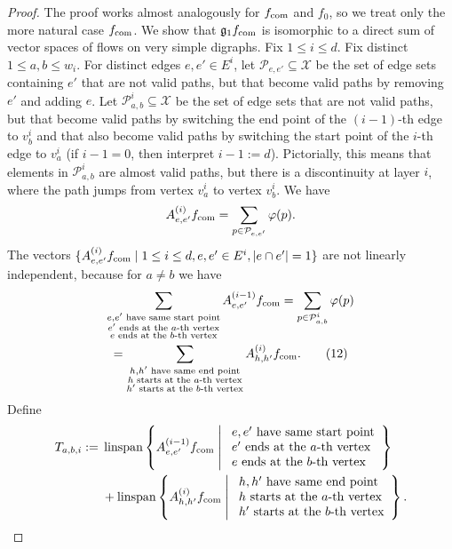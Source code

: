 \documentclass[10pt,a4paper]{article}
\newcommand{\fcom}{f_{\rm com}}
\newcommand{\g}{\mathfrak g}
\DeclareMathOperator{\linspan}{linspan}
\begin{document}
\begin{proof}
The proof works almost analogously for $\fcom$ and $f_0$, so we treat only the more natural case $\fcom$. We show that $\g_1\fcom$ is isomorphic to a direct sum of vector spaces of flows on very simple digraphs. Fix $1\le i\le d$. Fix distinct $1\le a,b\le w_i$. For distinct edges $e,e'\in E^i$, let $\mathcal P_{e,e'}\subseteq\mathcal X$ be the set of edge sets containing $e'$ that are not valid paths, but that become valid paths by removing $e'$ and adding $e$. Let $\mathcal P^i_{a,b}\subseteq\mathcal X$ be the set of edge sets that are not valid paths, but that become valid paths by switching the end point of the $(i-1)$-th edge to $v_b^i$ and that also become valid paths by switching the start point of the $i$-th edge to $v_a^i$ (if $i-1=0$, then interpret $i-1:=d$). Pictorially, this means that elements in $\mathcal P^i_{a,b}$ are almost valid paths, but there is a discontinuity at layer $i$, where the path jumps from vertex $v_a^i$ to vertex $v_b^i$. We have
\[A^{(i)}_{e,e'}\fcom=\sum_{p\in\mathcal P_{e,e'}}\varphi(p).\]
The vectors $\{A^{(i)}_{e,e'}\fcom\mid1\le i\le d,e,e'\in E^i,|e\cap e'|=1\}$ are not linearly independent, because for $a\ne b$ we have
\begin{multline*}
\sum_{\substack{e,e'\text{ have same start point}\\e'\text{ ends at the }a\text{-th vertex}\\e\text{ ends at the }b\text{-th vertex}}}A^{(i-1)}_{e,e'}\fcom=\sum_{p\in\mathcal P^i_{a,b}}\varphi(p)\\
=\sum_{\substack{h,h'\text{ have same end point}\\h\text{ starts at the }a\text{-th vertex}\\h'\text{ starts at the }b\text{-th vertex}}}A^{(i)}_{h,h'}\fcom.\tag{12}\label{eq:dependency}
\end{multline*}
Define
\begin{align*}
T_{a,b,i}:={}&\linspan\left\{A^{(i-1)}_{e,e'}\fcom\;\middle|\;\begin{array}{l}e,e'\text{ have same start point}\\e'\text{ ends at the }a\text{-th vertex}\\e\text{ ends at the }b\text{-th vertex}\end{array}\right\}\\
&+\linspan\left\{A^{(i)}_{h,h'}\fcom\;\middle|\;\begin{array}{l}h,h'\text{ have same end point}\\h\text{ starts at the }a\text{-th vertex}\\h'\text{ starts at the }b\text{-th vertex}\end{array}\right\}.

\end{align*}
\end{proof}
\end{document}

